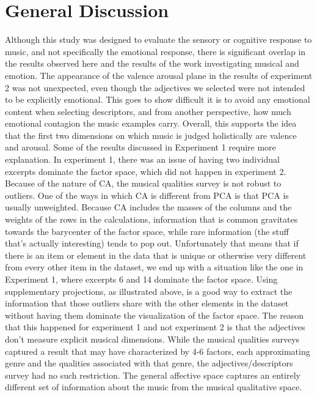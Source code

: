 \documentclass[
  english,
  man,floatsintext]{apa6}
\begin{document}
\hypertarget{general-discussion}{%
\section{General Discussion}\label{general-discussion}}

Although this study was designed to evaluate the sensory or cognitive response to music, and not specifically the emotional response, there is significant overlap in the results observed here and the results of the work investigating musical and emotion. The appearance of the valence arousal plane in the results of experiment 2 was not unexpected, even though the adjectives we selected were not intended to be explicitly emotional. This goes to show difficult it is to avoid any emotional content when selecting descriptors, and from another perspective, how much emotional contagion the music examples carry. Overall, this supports the idea that the first two dimensions on which music is judged holistically are valence and arousal.
Some of the results discussed in Experiment 1 require more explanation. In experiment 1, there was an issue of having two individual excerpts dominate the factor space, which did not happen in experiment 2. Because of the nature of CA, the musical qualities survey is not robust to outliers. One of the ways in which CA is different from PCA is that PCA is usually unweighted. Because CA includes the masses of the columns and the weights of the rows in the calculations, information that is common gravitates towards the barycenter of the factor space, while rare information (the stuff that's actually interesting) tends to pop out. Unfortunately that means that if there is an item or element in the data that is unique or otherwise very different from every other item in the dataset, we end up with a situation like the one in Experiment 1, where excerpts 6 and 14 dominate the factor space. Using supplementary projections, as illustrated above, is a good way to extract the information that those outliers share with the other elements in the dataset without having them dominate the visualization of the factor space. The reason that this happened for experiment 1 and not experiment 2 is that the adjectives don't measure explicit musical dimensions. While the musical qualities surveys captured a result that may have characterized by 4-6 factors, each approximating genre and the qualities associated with that genre, the adjectives/descriptors survey had no such restriction. The general affective space captures an entirely different set of information about the music from the musical qualitative space.\\
\end{document}
